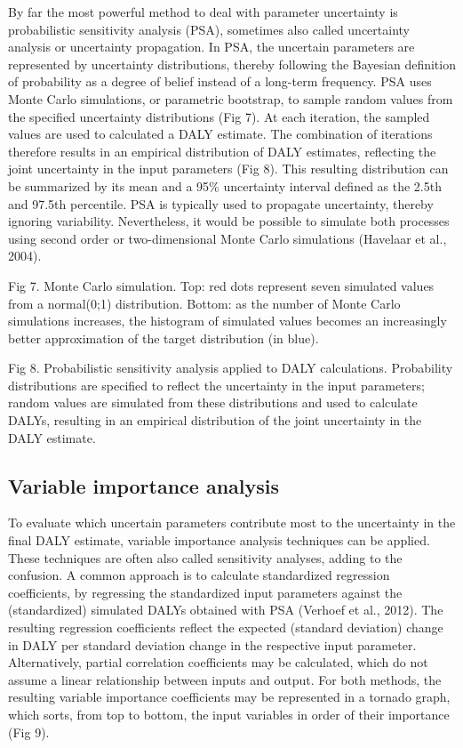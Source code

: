 \documentclass[]{book}
\begin{document}
By far the most powerful method to deal with parameter uncertainty is
probabilistic sensitivity analysis (PSA), sometimes also called
uncertainty analysis or uncertainty propagation. In PSA, the uncertain
parameters are represented by uncertainty distributions, thereby
following the Bayesian definition of probability as a degree of belief
instead of a long-term frequency. PSA uses Monte Carlo simulations, or
parametric bootstrap, to sample random values from the specified
uncertainty distributions (Fig 7). At each iteration, the sampled values
are used to calculated a DALY estimate. The combination of iterations
therefore results in an empirical distribution of DALY estimates,
reflecting the joint uncertainty in the input parameters (Fig 8). This
resulting distribution can be summarized by its mean and a 95\%
uncertainty interval defined as the 2.5th and 97.5th percentile. PSA is
typically used to propagate uncertainty, thereby ignoring variability.
Nevertheless, it would be possible to simulate both processes using
second order or two-dimensional Monte Carlo simulations (Havelaar et
al., 2004).

Fig 7. Monte Carlo simulation. Top: red dots represent seven simulated
values from a normal(0;1) distribution. Bottom: as the number of Monte
Carlo simulations increases, the histogram of simulated values becomes
an increasingly better approximation of the target distribution (in
blue).

Fig 8. Probabilistic sensitivity analysis applied to DALY calculations.
Probability distributions are specified to reflect the uncertainty in
the input parameters; random values are simulated from these
distributions and used to calculate DALYs, resulting in an empirical
distribution of the joint uncertainty in the DALY estimate.

\subsection{Variable importance
analysis}\label{variable-importance-analysis}

To evaluate which uncertain parameters contribute most to the
uncertainty in the final DALY estimate, variable importance analysis
techniques can be applied. These techniques are often also called
sensitivity analyses, adding to the confusion. A common approach is to
calculate standardized regression coefficients, by regressing the
standardized input parameters against the (standardized) simulated DALYs
obtained with PSA (Verhoef et al., 2012). The resulting regression
coefficients reflect the expected (standard deviation) change in DALY
per standard deviation change in the respective input parameter.
Alternatively, partial correlation coefficients may be calculated, which
do not assume a linear relationship between inputs and output. For both
methods, the resulting variable importance coefficients may be
represented in a tornado graph, which sorts, from top to bottom, the
input variables in order of their importance (Fig 9).
\end{document}
